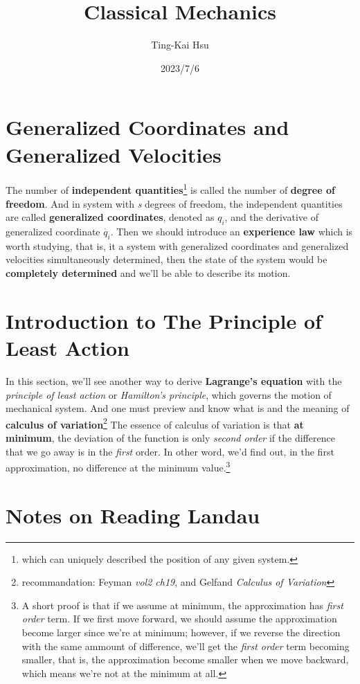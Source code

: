 \documentclass[12pt]{article}
\title{Classical Mechanics}
\author{Ting-Kai Hsu}
\date{2023/7/6}
\begin{document}
\maketitle
\tableofcontents
\section{Generalized Coordinates and Generalized Velocities}
The number of \textbf{independent quantities}\footnote{which can uniquely described the position of any given system.} is called the number of \textbf{degree of freedom}. And in system with \textit{s} degrees of freedom, the independent quantities are called \textbf{generalized coordinates}, denoted as $q_i$, and the derivative of generalized coordinate $\dot{q_i}$. Then we should introduce an \textbf{experience law} which is worth studying, that is, it a system with generalized coordinates and generalized velocities simultaneously determined, then the state of the system would be \textbf{completely determined} and we'll be able to describe its motion.

\section{Introduction to The Principle of Least Action}
In this section, we'll see another way to derive \textbf{Lagrange's equation} with the \textit{principle of least action} or \textit{Hamilton's principle}, which governs the motion of mechanical system.
And one must preview and know what is and the meaning of \textbf{calculus of variation}\footnote{recommandation: Feyman \textit{vol2 ch19}, and Gelfand \textit{Calculus of Variation}}
The essence of calculus of variation is that \textbf{at minimum}, the deviation of the function is only \textit{second order} if the difference that we go away is in the \textit{first} order. In other word, we'd find out, in the first approximation, no difference at the minimum value.\footnote{A short proof is that if we assume at minimum, the approximation has \textit{first order} term. If we first move forward, we should assume the approximation become larger since we're at minimum; however, if we reverse the direction with the same ammount of difference, we'll get the \textit{first order} term becoming smaller, that is, the approximation become smaller when we move backward, which means we're not at the minimum at all.}

\section{Notes on Reading Landau}
\end{document}
